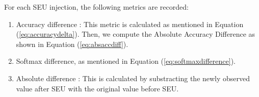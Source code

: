 \documentclass[ %
                    author={Revalda Putawara},
                supervisor={Dr. James Pope},
                    degree={MSc},
                     title={Robustness of Bayesian Neural Networks Design Choices Against Weight and Bias Perturbation Induced by Single Event Upsets (SEUs)},
                      type={},
                      year={2025}]{dissertation}
\begin{document}





For each SEU injection, the following metrics are recorded:
\begin{enumerate}[noitemsep, topsep=0pt]
    \item Accuracy difference : This metric is calculated as mentioned in  Equation (\ref{eq:accuracydelta}). Then, we compute the Absolute Accuracy Difference as shown in Equation (\ref{eq:absaccdiff}).
    \item Softmax difference, as mentioned in Equation (\ref{eq:softmaxdifference}).
    \item Absolute difference : This is calculated by substracting the newly observed value after SEU with the original value before SEU.
\end{enumerate}

\end{document}
